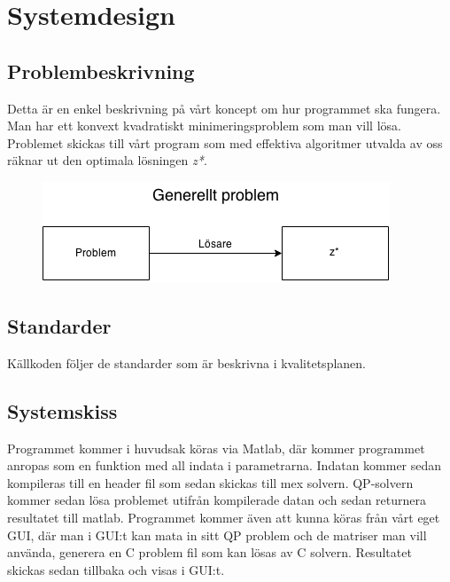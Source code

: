 \section{Systemdesign}


\subsection{Problembeskrivning}
Detta är en enkel beskrivning på vårt koncept om hur programmet ska fungera. Man har ett konvext kvadratiskt minimeringsproblem som man vill lösa. Problemet skickas till vårt program som med effektiva algoritmer utvalda av oss räknar ut den optimala lösningen \textit{z*}.

\begin{figure}[h]
	\begin{center}
		\includegraphics[scale=0.5]{bilder/generellt.png}
	\end{center}
\end{figure}

\subsection{Standarder}
Källkoden följer de standarder som är beskrivna i kvalitetsplanen.

\subsection{Systemskiss}
Programmet kommer i huvudsak köras via Matlab, där kommer programmet anropas som en funktion med all indata i parametrarna. Indatan kommer sedan kompileras till en header fil som sedan skickas till mex solvern. QP-solvern kommer sedan lösa problemet utifrån kompilerade datan och sedan returnera resultatet till matlab. Programmet kommer även att kunna köras från vårt eget GUI, där man i GUI:t kan mata in sitt QP problem och de matriser man vill använda, generera en C problem fil som kan lösas av C solvern. Resultatet skickas sedan tillbaka och visas i GUI:t.

